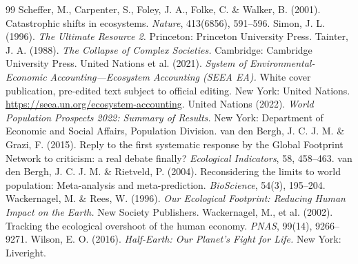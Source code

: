 \begin{thebibliography}{99}
 Scheffer, M., Carpenter, S., Foley, J. A., Folke, C. \& Walker, B. (2001). Catastrophic shifts in ecosystems. \emph{Nature}, 413(6856), 591--596.
 Simon, J. L. (1996). \emph{The Ultimate Resource 2.} Princeton: Princeton University Press.
 Tainter, J. A. (1988). \emph{The Collapse of Complex Societies.} Cambridge: Cambridge University Press.
 United Nations et al. (2021). \emph{System of Environmental-Economic Accounting---Ecosystem Accounting (SEEA EA).} White cover publication, pre-edited text subject to official editing. New York: United Nations. \url{https://seea.un.org/ecosystem-accounting}.
 United Nations (2022). \emph{World Population Prospects 2022: Summary of Results.} New York: Department of Economic and Social Affairs, Population Division.
 van den Bergh, J. C. J. M. \& Grazi, F. (2015). Reply to the first systematic response by the Global Footprint Network to criticism: a real debate finally? \emph{Ecological Indicators}, 58, 458--463.
 van den Bergh, J. C. J. M. \& Rietveld, P. (2004). Reconsidering the limits to world population: Meta-analysis and meta-prediction. \emph{BioScience}, 54(3), 195--204.
 Wackernagel, M. \& Rees, W. (1996). \emph{Our Ecological Footprint: Reducing Human Impact on the Earth.} New Society Publishers.
 Wackernagel, M., et al. (2002). Tracking the ecological overshoot of the human economy. \emph{PNAS}, 99(14), 9266--9271.
 Wilson, E. O. (2016). \emph{Half-Earth: Our Planet's Fight for Life.} New York: Liveright.
\end{thebibliography}


